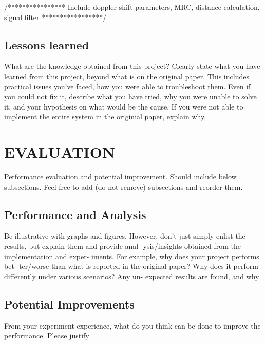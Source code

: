 \documentclass{acm_proc_article-sp}
\begin{document}
/****************
Include doppler shift parameters, MRC, distance calculation, signal filter
*****************/


\subsection{Lessons learned}
What are the knowledge obtained from this project? Clearly
state what you have learned from this project, beyond what
is on the original paper. This includes practical issues you’ve
faced, how you were able to troubleshoot them.  Even if you
could not fix it, describe what you have tried, why you were
unable to solve it, and your hypothesis on what would be the
cause.  If you were not able to implement the entire system
in the originial paper, explain why.

\section{EVALUATION} \label{evaluation}
Performance evaluation and potential improvement.  Should
include below subsections.  Feel free to add (do not remove)
subsections and reorder them.

\subsection{Performance and Analysis}
Be illustrative with graphs and figures.  However, don’t just
simply enlist the results, but explain them and provide anal-
ysis/insights obtained from the implementation and exper-
iments.  For example, why does your project performs bet-
ter/worse than what is reported in the original paper?  Why
does it perform differently under various scenarios?  Any un-
expected results are found, and why

\subsection{Potential Improvements}
From  your  experiment  experience,  what  do  you  think  can
be done to improve the performance.  Please justify

%

%
%
\end{document}
